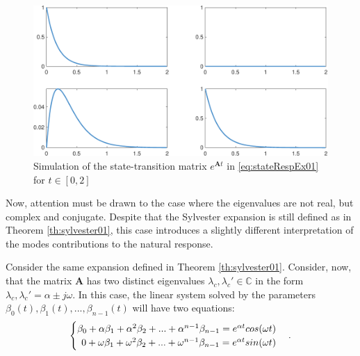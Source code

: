 \documentclass[a4paper,11pt]{book}
\numberwithin{figure}{chapter}
\numberwithin{equation}{chapter}
\numberwithin{table}{chapter}
\newtheorem{theorem}{Theorem}[chapter]
\theoremstyle{definition}
\newcounter{boxed-theorem}
\newenvironment{boxed-theorem}[1]
{\colorlet{shadecolor}{pastelBlue2!10} \begin{shaded} \begin{theorem}{#1}}
{\end{theorem} \end{shaded}}
\newcounter{boxed-definition}
\newcounter{boxed-example}
\begin{document}
\begin{figure}[ht]
    \centering
    \includegraphics[width=\textwidth]{chapter2/stateTrans01}
    \caption{Simulation of the state-transition matrix $e^{\bm{A} t}$ in \eqref{eq:stateRespEx01} for $t \in [0,2]$}
    \label{fig:stateTrans01}
\end{figure}

Now, attention must be drawn to the case where the eigenvalues are not real, but complex and conjugate. Despite that the Sylvester expansion is still defined as in Theorem \ref{th:sylvester01}, this case introduces a slightly different interpretation of the modes contributions to the natural response.

\begin{boxed-theorem}{} \label{th:sylvester02}
    Consider the same expansion defined in Theorem \ref{th:sylvester01}. Consider, now, that the matrix $\bm{A}$ has two distinct eigenvalues $\lambda_c, \lambda_c' \in \mathbb{C}$ in the form $\lambda_c, \lambda_c' = \alpha \pm j \omega$. In this case, the linear system solved by the parameters $\beta_0(t), \beta_1(t), ..., \beta_{n-1}(t)$ will have two equations:
    \begin{align} \label{eq:sylvEq01}
    \begin{cases}
        \beta_0 + \alpha \beta_1 + \alpha^{2} \beta_2 + ... + \alpha^{n-1} \beta_{n-1} = e^{\alpha t} cos(\omega t) & \\
        \hfill 0 + \omega \beta_1 + \omega^{2} \beta_2 + ... + \omega^{n-1} \beta_{n-1} = e^{\alpha t} sin(\omega t) &
    \end{cases}
    .\end{align}
\end{boxed-theorem}
\end{document}
